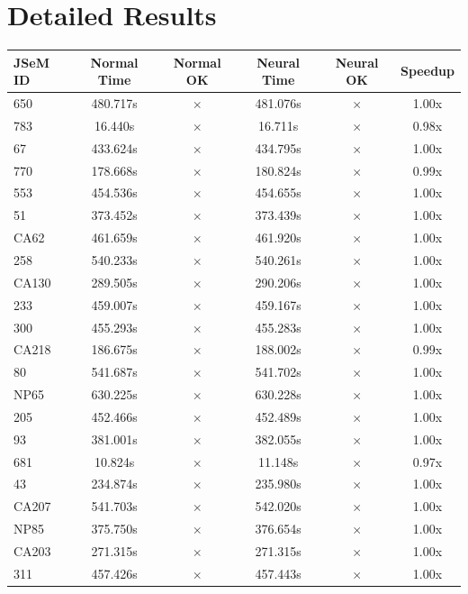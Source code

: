\documentclass[a4paper,10pt]{article}
\begin{document}
\section{Detailed Results}
\begin{longtable}{lccccc}
\toprule
\textbf{JSeM ID} & \textbf{Normal Time} & \textbf{Normal OK} & \textbf{Neural Time} & \textbf{Neural OK} & \textbf{Speedup} \\
\midrule
\endhead
650 & 480.717s & $\times$ & 481.076s & $\times$ & 1.00x \\
783 & 16.440s & $\times$ & 16.711s & $\times$ & 0.98x \\
67 & 433.624s & $\times$ & 434.795s & $\times$ & 1.00x \\
770 & 178.668s & $\times$ & 180.824s & $\times$ & 0.99x \\
553 & 454.536s & $\times$ & 454.655s & $\times$ & 1.00x \\
51 & 373.452s & $\times$ & 373.439s & $\times$ & 1.00x \\
CA62 & 461.659s & $\times$ & 461.920s & $\times$ & 1.00x \\
258 & 540.233s & $\times$ & 540.261s & $\times$ & 1.00x \\
CA130 & 289.505s & $\times$ & 290.206s & $\times$ & 1.00x \\
233 & 459.007s & $\times$ & 459.167s & $\times$ & 1.00x \\
300 & 455.293s & $\times$ & 455.283s & $\times$ & 1.00x \\
CA218 & 186.675s & $\times$ & 188.002s & $\times$ & 0.99x \\
80 & 541.687s & $\times$ & 541.702s & $\times$ & 1.00x \\
NP65 & 630.225s & $\times$ & 630.228s & $\times$ & 1.00x \\
205 & 452.466s & $\times$ & 452.489s & $\times$ & 1.00x \\
93 & 381.001s & $\times$ & 382.055s & $\times$ & 1.00x \\
681 & 10.824s & $\times$ & 11.148s & $\times$ & 0.97x \\
43 & 234.874s & $\times$ & 235.980s & $\times$ & 1.00x \\
CA207 & 541.703s & $\times$ & 542.020s & $\times$ & 1.00x \\
NP85 & 375.750s & $\times$ & 376.654s & $\times$ & 1.00x \\
CA203 & 271.315s & $\times$ & 271.315s & $\times$ & 1.00x \\
311 & 457.426s & $\times$ & 457.443s & $\times$ & 1.00x \\

\end{longtable}
\end{document}
